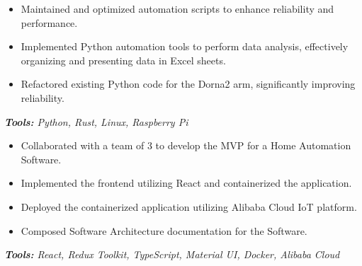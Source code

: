 \documentclass[10pt,letter]{altacv}
\begin{document}

\begin{fullwidth}
\makecvheader
\end{fullwidth}


\medskip


\begin{itemize}
  \item Maintained and optimized automation scripts to enhance reliability and performance.
  \item Implemented Python automation tools to perform data analysis, effectively organizing and presenting data in Excel sheets.
  \item Refactored existing Python code for the Dorna2 arm, significantly improving reliability.
\end{itemize}
\textit{\textbf{Tools:} Python, Rust, Linux, Raspberry Pi}

\divider

\begin{itemize}
  \item Collaborated with a team of 3 to develop the MVP for a Home Automation Software.
  \item Implemented the frontend utilizing React and containerized the application.
  \item Deployed the containerized application utilizing Alibaba Cloud IoT platform.
  \item Composed Software Architecture documentation for the Software. 
\end{itemize}
\textit{\textbf{Tools:} React, Redux Toolkit, TypeScript, Material UI, Docker, Alibaba Cloud}
\end{document}
